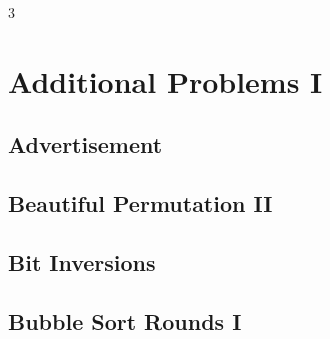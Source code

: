 \documentclass[8pt]{extarticle}
\begin{document}
\begin{multicols*}{3}

\section{Additional Problems I}

\subsection{Advertisement}
\begin{caixaenunciado}

\end{caixaenunciado}
\vspace{0.3cm}


\subsection{Beautiful Permutation II}
\begin{caixaenunciado}

\end{caixaenunciado}
\vspace{0.3cm}


\subsection{Bit Inversions}
\begin{caixaenunciado}

\end{caixaenunciado}
\vspace{0.3cm}


\subsection{Bubble Sort Rounds I}
\begin{caixaenunciado}

\end{caixaenunciado}
\vspace{0.3cm}



\end{multicols*}
\end{document}
